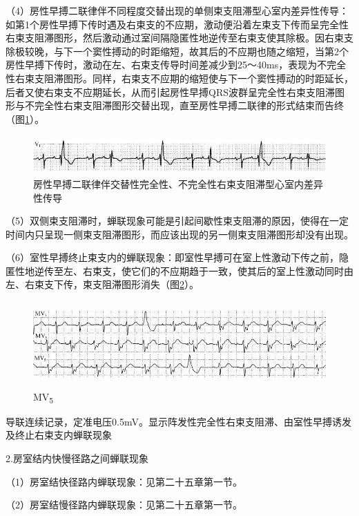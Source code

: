 （4）房性早搏二联律伴不同程度交替出现的单侧束支阻滞型心室内差异性传导：如第1个房性早搏下传时遇及右束支的不应期，激动便沿着左束支下传而呈完全性右束支阻滞图形，然后激动通过室间隔隐匿性地逆传至右束支使其除极。因右束支除极较晚，与下一个窦性搏动的时距缩短，故其后的不应期也随之缩短，当第2个房性早搏下传时，激动在左、右束支传导时间差减少到25～40ms，表现为不完全性右束支阻滞图形。同样，右束支不应期的缩短使与下一个窦性搏动的时距延长，后者又使右束支不应期延长，从而引起房性早搏QRS波群呈完全性右束支阻滞图形与不完全性右束支阻滞图形交替出现，直至房性早搏二联律的形式结束而告终（图\ref{fig35-6}）。

\begin{figure}[!htbp]
 \centering
 \includegraphics[width=5.58333in,height=0.58333in]{./images/Image00559.jpg}
 \captionsetup{justification=centering}
 \caption{房性早搏二联律伴交替性完全性、不完全性右束支阻滞型心室内差异性传导}
 \label{fig35-6}
  \end{figure} 

（5）双侧束支阻滞时，蝉联现象可能是引起间歇性束支阻滞的原因，使得在一定时间内只呈现一侧束支阻滞图形，而应该出现的另一侧束支阻滞图形却没有出现。

（6）室性早搏终止束支内的蝉联现象：即室性早搏可在室上性激动下传之前，隐匿性地逆传至左、右束支，使它们的不应期趋于一致，使其后的室上性激动同时由左、右束支下传，束支阻滞图形消失（图\ref{fig35-7}）。

\begin{figure}[!htbp]
 \centering
 \includegraphics[width=5.58333in,height=1.29167in]{./images/Image00560.jpg}
 \captionsetup{justification=centering}
 \caption{MV\textsubscript{5}}
 \label{fig35-7}
  \end{figure} 
导联连续记录，定准电压0.5mV。显示阵发性完全性右束支阻滞、由室性早搏诱发及终止右束支内蝉联现象

2.房室结内快慢径路之间蝉联现象

（1）房室结快径路内蝉联现象：见第二十五章第一节。

（2）房室结慢径路内蝉联现象：见第二十五章第一节。

